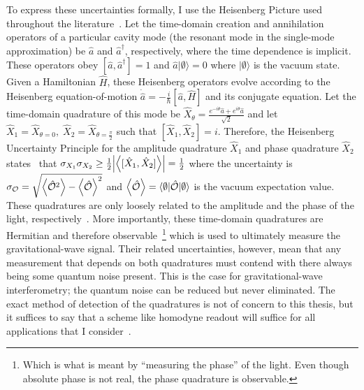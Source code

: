 To express these uncertainties formally, I use the Heisenberg Picture used throughout the literature~\cite{Danilishin,}. Let the time-domain creation and annihilation operators of a particular cavity mode (the resonant mode in the single-mode approximation) be $\hat{a}$ and $\hat{a}^\dag$, respectively, where the time dependence is implicit. These operators obey $[\hat{a},\hat{a}^\dag]=1$ and $\hat{a}\lvert\emptyset\rangle=0$ where $\lvert\emptyset\rangle$ is the vacuum state. Given a Hamiltonian $\hat H$, these Heisenberg operators evolve according to the Heisenberg equation-of-motion $\dot{\hat{a}}=-\frac{i}{\hbar} [\hat a, \hat H]$ and its conjugate equation. Let the time-domain quadrature of this mode be $\hat{X}_\theta=\frac{e^{-i \theta}\hat{a}+e^{i \theta}\hat{a}}{\sqrt 2}$ and let $\hat{X}_1=\hat{X}_{\theta=0},\; \hat{X}_2=\hat{X}_{\theta=\frac{\pi}{2}}$ such that $[\hat{X}_1,\hat{X}_2]=i$. Therefore, the Heisenberg Uncertainty Principle for the amplitude quadrature $\hat{X}_1$ and phase quadrature $\hat{X}_2$ states~\cite{} that $\sigma_{X_1}\sigma_{X_2}\geq\frac{1}{2}\abs{\ev{[\hat{X}_1,\hat{X}_2]}}=\frac{1}{2}$  where the uncertainty is $\sigma_\mathcal{O}=\sqrt{\ev{\hat{\mathcal{O}}^2}-\ev{\hat{\mathcal{O}}}^2}$ and $\ev{\hat{\mathcal{O}}}=\langle\emptyset\lvert\hat{\mathcal{O}}\rvert\emptyset\rangle$ is the vacuum expectation value. These quadratures are only loosely related to the amplitude and the phase of the light, respectively~\cite{Danilishin}. More importantly, these time-domain quadratures are Hermitian and therefore observable~\footnote{Which is what is meant by ``measuring the phase'' of the light. Even though absolute phase is not real, the phase quadrature is observable.} which is used to ultimately measure the gravitational-wave signal. Their related uncertainties, however, mean that any measurement that depends on both quadratures must contend with there always being some quantum noise present. This is the case for gravitational-wave interferometry; the quantum noise can be reduced but never eliminated.
The exact method of detection of the quadratures is not of concern to this thesis, but it suffices to say that a scheme like homodyne readout will suffice for all applications that I consider~\cite{}.

